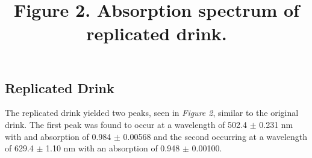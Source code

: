 \documentclass[12pt]{article}
\begin{document}
\subsection*{Replicated Drink}
The replicated drink yielded two peaks, seen in \textit{Figure 2}, similar to the original drink.  The first peak was found to occur at a wavelength of 502.4 $\pm$ 0.231 nm with and absorption of 0.984 $\pm$ 0.00568 and the second occurring at a wavelength of 629.4 $\pm$ 1.10 nm with an absorption of 0.948 $\pm$ 0.00100.\par\vspace{6pt}
\title{\textbf{Figure 2.} Absorption spectrum of replicated drink.}
\begin {figure}[htb!]
  \begin{center}
    	\resizebox{0.6\textwidth}{!}{}
  \end	{center}
\end {figure}
%
\end{document}

